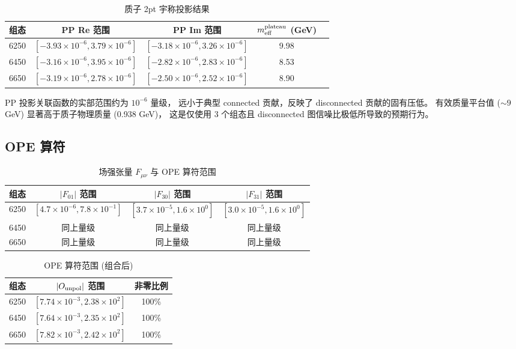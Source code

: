 \documentclass[11pt,a4paper]{article}
\begin{document}
\begin{table}[H]
  \centering
  \caption{质子 2pt 宇称投影结果}
  \label{tab:twopt}
  \begin{tabular}{lcccc}
    \toprule
    组态 & PP Re 范围 & PP Im 范围 & $m_{\rm eff}^{\rm plateau}$ (GeV) \\
    \midrule
    6250 & $[-3.93\times 10^{-6}, 3.79\times 10^{-6}]$
         & $[-3.18\times 10^{-6}, 3.26\times 10^{-6}]$
         & 9.98 \\
    6450 & $[-3.16\times 10^{-6}, 3.95\times 10^{-6}]$
         & $[-2.82\times 10^{-6}, 2.83\times 10^{-6}]$
         & 8.53 \\
    6650 & $[-3.19\times 10^{-6}, 2.78\times 10^{-6}]$
         & $[-2.50\times 10^{-6}, 2.52\times 10^{-6}]$
         & 8.90 \\
    \bottomrule
  \end{tabular}
\end{table}

PP 投影关联函数的实部范围约为 $10^{-6}$ 量级，
远小于典型 connected 贡献，反映了 disconnected 贡献的固有压低。
有效质量平台值 ($\sim 9$ GeV) 显著高于质子物理质量 (0.938 GeV)，
这是仅使用 3 个组态且 disconnected 图信噪比极低所导致的预期行为。

\subsection{OPE 算符}

\begin{table}[H]
  \centering
  \caption{场强张量 $F_{\mu\nu}$ 与 OPE 算符范围}
  \label{tab:ope}
  \begin{tabular}{lccc}
    \toprule
    组态 & $|F_{01}|$ 范围 & $|F_{30}|$ 范围 & $|F_{31}|$ 范围 \\
    \midrule
    6250 & $[4.7\times 10^{-6}, 7.8\times 10^{-1}]$
         & $[3.7\times 10^{-5}, 1.6\times 10^{0}]$
         & $[3.0\times 10^{-5}, 1.6\times 10^{0}]$ \\
    6450 & 同上量级 & 同上量级 & 同上量级 \\
    6650 & 同上量级 & 同上量级 & 同上量级 \\
    \bottomrule
  \end{tabular}
\end{table}

\begin{table}[H]
  \centering
  \caption{OPE 算符范围 (组合后)}
  \label{tab:ope_combined}
  \begin{tabular}{lcc}
    \toprule
    组态 & $|O_{\rm unpol}|$ 范围 & 非零比例 \\
    \midrule
    6250 & $[7.74\times 10^{-3}, 2.38\times 10^{2}]$ & 100\% \\
    6450 & $[7.64\times 10^{-3}, 2.35\times 10^{2}]$ & 100\% \\
    6650 & $[7.82\times 10^{-3}, 2.42\times 10^{2}]$ & 100\% \\
    \bottomrule
  \end{tabular}
\end{table}
\end{document}
